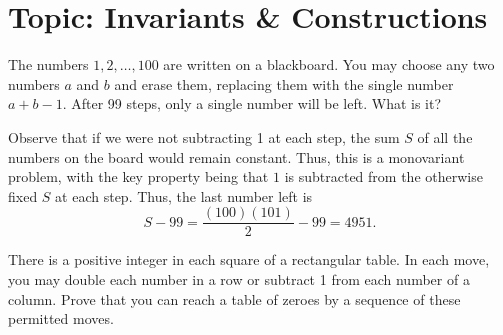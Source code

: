 

\DeclareRobustCommand{\stirling}{\genfrac\{\}{0pt}{}}
\setcounter{secnumdepth}{0} 

\newcommand{\weekNum}{8} %
\newcommand{\meetingDate}{Mar 12, 2025} 


\pagestyle{empty}
\sloppy
\maketitle

\section{Topic: Invariants \& Constructions}

\begin{problem}
    The numbers $1, 2, \ldots , 100$ are written on a blackboard. You may choose any two numbers $a$ and $b$ and erase them, replacing them with the single number $a + b - 1$. After 99 steps, only a single number will be left. What is it?
\end{problem}

\begin{solution}
    Observe that if we were not subtracting 1 at each step, the sum $S$ of all the numbers on the board would remain constant. Thus, this is a monovariant problem, with the key property being that $1$ is subtracted from the otherwise fixed $S$ at each step. Thus, the last number left is
    \[ S-99=\frac{(100)(101)}{2}-99=\boxed{4951}. \]\vspace{-20pt}
\end{solution}

\begin{problem}[C][3][Engel]
    There is a positive integer in each square of a rectangular table. In each move, you may double each number in a row or subtract 1 from each number of a column. Prove that you can reach a table of zeroes by a sequence of these permitted moves.
\end{problem}

